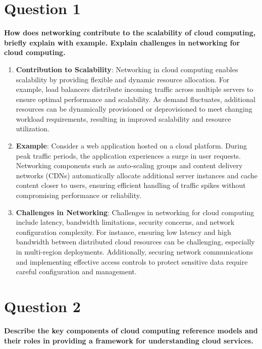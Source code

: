 \documentclass[11pt]{article}
\begin{document}
\tableofcontents
\thispagestyle{empty}
\clearpage
\setcounter{page}{1}
\section{Question 1}
\textbf{How does networking contribute to the scalability of cloud computing, briefly explain with example. Explain challenges in networking for cloud computing.}

\begin{enumerate}
    \item \textbf{Contribution to Scalability}: Networking in cloud computing enables scalability by providing flexible and dynamic resource allocation. For example, load balancers distribute incoming traffic across multiple servers to ensure optimal performance and scalability. As demand fluctuates, additional resources can be dynamically provisioned or deprovisioned to meet changing workload requirements, resulting in improved scalability and resource utilization.

    \item \textbf{Example}: Consider a web application hosted on a cloud platform. During peak traffic periods, the application experiences a surge in user requests. Networking components such as auto-scaling groups and content delivery networks (CDNs) automatically allocate additional server instances and cache content closer to users, ensuring efficient handling of traffic spikes without compromising performance or reliability.

    \item \textbf{Challenges in Networking}: Challenges in networking for cloud computing include latency, bandwidth limitations, security concerns, and network configuration complexity. For instance, ensuring low latency and high bandwidth between distributed cloud resources can be challenging, especially in multi-region deployments. Additionally, securing network communications and implementing effective access controls to protect sensitive data require careful configuration and management.
\end{enumerate}

\section{Question 2}
\textbf{Describe the key components of cloud computing reference models and their roles in providing a framework for understanding cloud services.}
\end{document}
